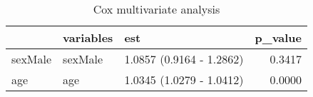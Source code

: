 \begin{table}

\caption{Cox multivariate analysis}
\centering
\begin{tabular}[t]{l|l|l|r}
\hline
  & variables & est & p\_value\\
\hline
sexMale & sexMale & 1.0857 (0.9164 - 1.2862) & 0.3417\\
\hline
age & age & 1.0345 (1.0279 - 1.0412) & 0.0000\\
\hline
\end{tabular}
\end{table}
